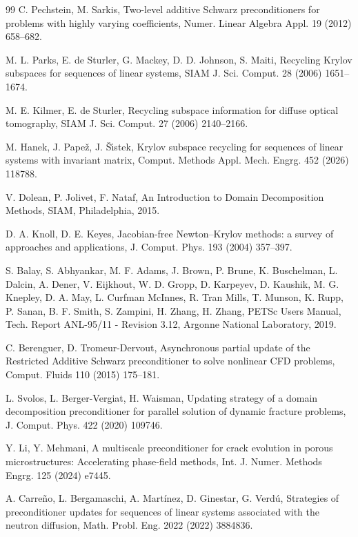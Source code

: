 \documentclass[preprint,12pt,3p]{elsarticle}
\begin{document}
\begin{thebibliography}{99}
C. Pechstein, M. Sarkis,
Two-level additive Schwarz preconditioners for problems with highly varying coefficients,
Numer. Linear Algebra Appl. 19 (2012) 658--682.

M. L. Parks, E. de Sturler, G. Mackey, D. D. Johnson, S. Maiti,
Recycling Krylov subspaces for sequences of linear systems,
SIAM J. Sci. Comput. 28 (2006) 1651--1674.

M. E. Kilmer, E. de Sturler,
Recycling subspace information for diffuse optical tomography,
SIAM J. Sci. Comput. 27 (2006) 2140--2166.

M. Hanek, J. Pape{\v{z}}, J. {\v{S}}{\'\i}stek,
Krylov subspace recycling for sequences of linear systems with invariant matrix,
Comput. Methods Appl. Mech. Engrg. 452 (2026) 118788.

V. Dolean, P. Jolivet, F. Nataf,
An Introduction to Domain Decomposition Methods,
SIAM, Philadelphia, 2015.

D. A. Knoll, D. E. Keyes,
Jacobian-free Newton--Krylov methods: a survey of approaches and applications,
J. Comput. Phys. 193 (2004) 357--397.

S. Balay, S. Abhyankar, M. F. Adams, J. Brown, P. Brune, K. Buschelman, L. Dalcin, A. Dener, V. Eijkhout, W. D. Gropp, D. Karpeyev, D. Kaushik, M. G. Knepley, D. A. May, L. Curfman McInnes, R. Tran Mills, T. Munson, K. Rupp, P. Sanan, B. F. Smith, S. Zampini, H. Zhang, H. Zhang,
PETSc Users Manual,
Tech. Report ANL-95/11 - Revision 3.12, Argonne National Laboratory, 2019.

C. Berenguer, D. Tromeur-Dervout,
Asynchronous partial update of the Restricted Additive Schwarz preconditioner to solve nonlinear CFD problems,
Comput. Fluids 110 (2015) 175--181.

L. Svolos, L. Berger-Vergiat, H. Waisman,
Updating strategy of a domain decomposition preconditioner for parallel solution of dynamic fracture problems,
J. Comput. Phys. 422 (2020) 109746.

Y. Li, Y. Mehmani,
A multiscale preconditioner for crack evolution in porous microstructures: Accelerating phase-field methods,
Int. J. Numer. Methods Engrg. 125 (2024) e7445.

A. Carre\~{n}o, L. Bergamaschi, A. Mart\'inez, D. Ginestar, G. Verd\'u,
Strategies of preconditioner updates for sequences of linear systems associated with the neutron diffusion,
Math. Probl. Eng. 2022 (2022) 3884836.

\end{thebibliography}
\end{document}
